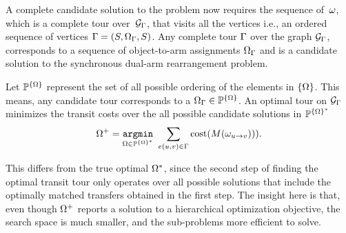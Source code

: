 A complete candidate solution to the problem now requires the sequence of~$ {\omega} $, 
which is a complete tour over~$ \mathcal{G}_{{\Gamma}} $, that visits all the vertices i.e., an ordered sequence of vertices ${\Gamma} = ( {S}, {{\Omega}}_{\Gamma}, {S}  )$.
{
\lemma [Tour]
Any complete tour $ {\Gamma} $ over the graph $ \mathcal{G}_{{\Gamma}} $, corresponds to a sequence of object-to-arm assignments $ {{\Omega}}_{\Gamma} $ and is a candidate solution to the synchronous dual-arm rearrangement problem.
}



Let $ \mathbb{P}^{\{{{\Omega}}\}} $ represent the set of all possible ordering of the elements in $ \{{{\Omega}}\} $. This means, any candidate tour corresponds to a $ {{\Omega}}_{\Gamma}\in\mathbb{P}^{\{{{\Omega}}\}} $. An optimal tour on $ \mathcal{G}_{{\Gamma}} $ minimizes the transit costs over the all possible candidate solutions in  $ \mathbb{P}^{\{{{\Omega}}\}^*} $
\begin{equation}
{{\Omega}}^+ = \underset{ {{\Omega}} \in  \mathbb{P}^{\{{{\Omega}}\}^*}   }{ \mathtt{argmin} } \ \sum_{e(u,v)\in{\Gamma}}\textup{cost}({M}( {\omega}_{u\rightarrow v} ))  ).
\end{equation}

This differs from the true optimal $ {{\Omega}}^* $, since the second step of finding the optimal transit tour only operates over all possible solutions that include the optimally matched transfers obtained in the first step.
The insight here is that, even though $ {{\Omega}}^+ $ reports a solution to a hierarchical optimization objective, 
the search space is much smaller, and the sub-problems more efficient to solve.\\

\vspace{-0.1in}
